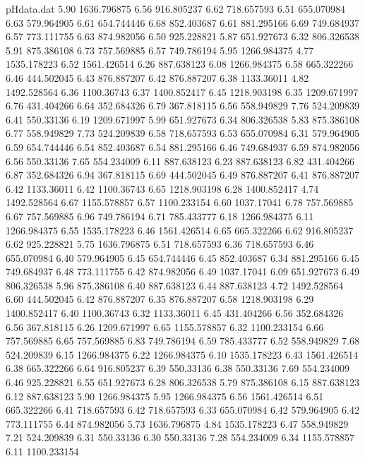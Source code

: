 \begin{filecontents}{pHdata.dat}
5.90 	1636.796875
6.56 	916.805237
6.62 	718.657593
6.51 	655.070984
6.63 	579.964905
6.61 	654.744446
6.68 	852.403687
6.61 	881.295166
6.69 	749.684937
6.57 	773.111755
6.63 	874.982056
6.50 	925.228821
5.87 	651.927673
6.32 	806.326538
5.91 	875.386108
6.73 	757.569885
6.57 	749.786194
5.95 	1266.984375
4.77 	1535.178223
6.52 	1561.426514
6.26 	887.638123
6.08 	1266.984375
6.58 	665.322266
6.46 	444.502045
6.43 	876.887207
6.42 	876.887207
6.38 	1133.36011
4.82 	1492.528564
6.36 	1100.36743
6.37 	1400.852417
6.45 	1218.903198
6.35 	1209.671997
6.76 	431.404266
6.64 	352.684326
6.79 	367.818115
6.56 	558.949829
7.76 	524.209839
6.41 	550.33136
6.19 	1209.671997
5.99 	651.927673
6.34 	806.326538
5.83 	875.386108
6.77 	558.949829
7.73 	524.209839
6.58 	718.657593
6.53 	655.070984
6.31 	579.964905
6.59 	654.744446
6.54 	852.403687
6.54 	881.295166
6.46 	749.684937
6.59 	874.982056
6.56 	550.33136
7.65 	554.234009
6.11 	887.638123
6.23 	887.638123
6.82 	431.404266
6.87 	352.684326
6.94 	367.818115
6.69 	444.502045
6.49 	876.887207
6.41 	876.887207
6.42 	1133.36011
6.42 	1100.36743
6.65 	1218.903198
6.28 	1400.852417
4.74 	1492.528564
6.67 	1155.578857
6.57 	1100.233154
6.60 	1037.17041
6.78 	757.569885
6.67 	757.569885
6.96 	749.786194
6.71 	785.433777
6.18 	1266.984375
6.11 	1266.984375
6.55 	1535.178223
6.46 	1561.426514
6.65 	665.322266
6.62 	916.805237
6.62 	925.228821
5.75 	1636.796875
6.51 	718.657593
6.36 	718.657593
6.46 	655.070984
6.40 	579.964905
6.45 	654.744446
6.45 	852.403687
6.34 	881.295166
6.45 	749.684937
6.48 	773.111755
6.42 	874.982056
6.49 	1037.17041
6.09 	651.927673
6.49 	806.326538
5.96 	875.386108
6.40 	887.638123
6.44 	887.638123
4.72 	1492.528564
6.60 	444.502045
6.42 	876.887207
6.35 	876.887207
6.58 	1218.903198
6.29 	1400.852417
6.40 	1100.36743
6.32 	1133.36011
6.45 	431.404266
6.56 	352.684326
6.56 	367.818115
6.26 	1209.671997
6.65 	1155.578857
6.32 	1100.233154
6.66 	757.569885
6.65 	757.569885
6.83 	749.786194
6.59 	785.433777
6.52 	558.949829
7.68 	524.209839
6.15 	1266.984375
6.22 	1266.984375
6.10 	1535.178223
6.43 	1561.426514
6.38 	665.322266
6.64 	916.805237
6.39 	550.33136
6.38 	550.33136
7.69 	554.234009
6.46 	925.228821
6.55 	651.927673
6.28 	806.326538
5.79 	875.386108
6.15 	887.638123
6.12 	887.638123
5.90 	1266.984375
5.95 	1266.984375
6.56 	1561.426514
6.51 	665.322266
6.41 	718.657593
6.42 	718.657593
6.33 	655.070984
6.42 	579.964905
6.42 	773.111755
6.44 	874.982056
5.73 	1636.796875
4.84 	1535.178223
6.47 	558.949829
7.21 	524.209839
6.31 	550.33136
6.30 	550.33136
7.28 	554.234009
6.34 	1155.578857
6.11 	1100.233154

\end{filecontents}
